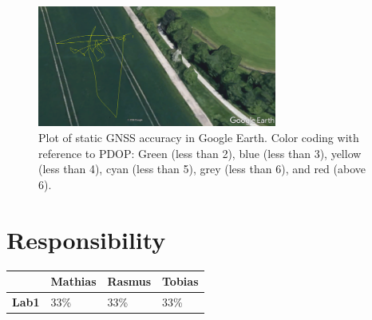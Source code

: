 \documentclass[a4paper,10pt,fleqn]{article}
\begin{document}
\begin{figure}[]
    \centering 
    \includegraphics[width=0.7\textwidth]{./graphics/GNSS_accuracy.png}
    \caption[]{Plot of static GNSS accuracy in Google Earth. Color coding with reference to PDOP: Green (less than 2), blue (less than 3), yellow (less than 4), cyan (less than 5), grey (less than 6), and red (above 6).}
    \label{fig:satellite}
\end{figure}

\newpage
\section{Responsibility}
\begin{table}[h!]
\centering
\begin{tabular}{l|l|l|l|}
\cline{2-4}
 & \multicolumn{1}{c|}{\textbf{Mathias}} & \multicolumn{1}{c|}{\textbf{Rasmus}} & \multicolumn{1}{c|}{\textbf{Tobias}} \\ \hline
\multicolumn{1}{|l|}{\textbf{Lab1}} & 33\% & 33\% & 33\% \\ \hline
\end{tabular}
\label{my-label}
\end{table}
\end{document}
